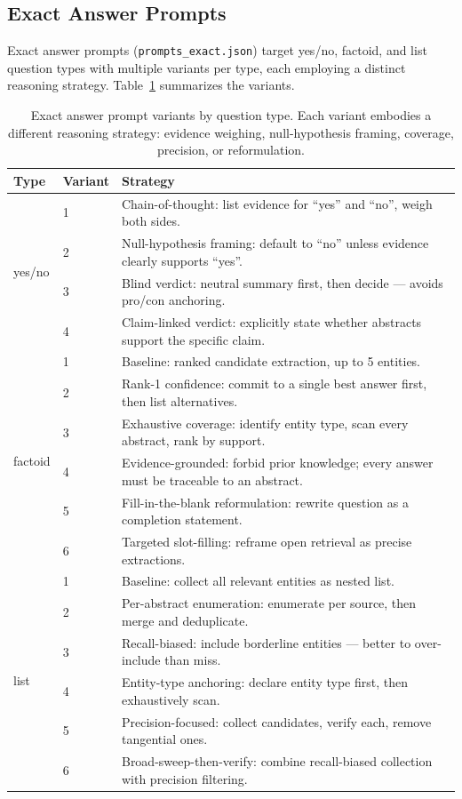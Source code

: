 \subsection{Exact Answer Prompts}
Exact answer prompts (\texttt{prompts\_exact.json}) target yes/no, factoid, and list question types with multiple variants per type, each employing a distinct reasoning strategy. Table~\ref{tab:prompts-exact} summarizes the variants.
\begin{table}[ht]
  \centering
  \caption{Exact answer prompt variants by question type. Each variant embodies a different reasoning strategy: evidence weighing, null-hypothesis framing, coverage, precision, or reformulation.}
  \label{tab:prompts-exact}
  \footnotesize
  \begin{tabular}{llp{11.5cm}}
    \toprule
    \textbf{Type} & \textbf{Variant} & \textbf{Strategy} \\
    \midrule
    \multirow{4}{*}{yes/no} & 1 & Chain-of-thought: list evidence for ``yes'' and ``no'', weigh both sides. \\
    & 2 & Null-hypothesis framing: default to ``no'' unless evidence clearly supports ``yes''. \\
    & 3 & Blind verdict: neutral summary first, then decide --- avoids pro/con anchoring. \\
    & 4 & Claim-linked verdict: explicitly state whether abstracts support the specific claim. \\
    \midrule
    \multirow{6}{*}{factoid} & 1 & Baseline: ranked candidate extraction, up to 5 entities. \\
    & 2 & Rank-1 confidence: commit to a single best answer first, then list alternatives. \\
    & 3 & Exhaustive coverage: identify entity type, scan every abstract, rank by support. \\
    & 4 & Evidence-grounded: forbid prior knowledge; every answer must be traceable to an abstract. \\
    & 5 & Fill-in-the-blank reformulation: rewrite question as a completion statement. \\
    & 6 & Targeted slot-filling: reframe open retrieval as precise extractions. \\
    \midrule
    \multirow{6}{*}{list} & 1 & Baseline: collect all relevant entities as nested list. \\
    & 2 & Per-abstract enumeration: enumerate per source, then merge and deduplicate. \\
    & 3 & Recall-biased: include borderline entities --- better to over-include than miss. \\
    & 4 & Entity-type anchoring: declare entity type first, then exhaustively scan. \\
    & 5 & Precision-focused: collect candidates, verify each, remove tangential ones. \\
    & 6 & Broad-sweep-then-verify: combine recall-biased collection with precision filtering. \\
    \bottomrule
  \end{tabular}
\end{table}
